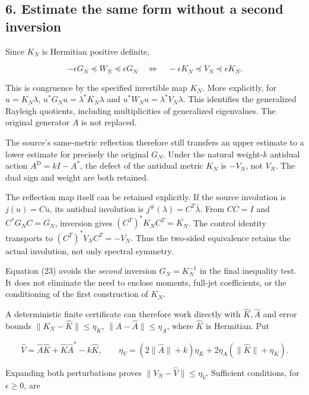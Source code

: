 \documentclass[
]{article}
\begin{document}
\subsection{6. Estimate the same form without a second
inversion}\label{estimate-the-same-form-without-a-second-inversion}

Since \(K_N\) is Hermitian positive definite,

\[
\boxed{-\epsilon G_N\preceq W_N\preceq\epsilon G_N
\quad\Longleftrightarrow\quad
-\epsilon K_N\preceq V_N\preceq\epsilon K_N.}
\tag{23}
\]

This is congruence by the specified invertible map \(K_N\). More
explicitly, for \(u=K_N\lambda\), \(u^*G_Nu=\lambda^*K_N\lambda\) and
\(u^*W_Nu=\lambda^*V_N\lambda\). This identifies the generalized
Rayleigh quotients, including multiplicities of generalized eigenvalues.
The original generator \(A\) is not replaced.

The source's same-metric reflection therefore still transfers an upper
estimate to a lower estimate for precisely the original \(G_N\). Under
the natural weight-\(k\) antidual action \(A^{\mathrm D}=kI-A^*\), the
defect of the antidual metric \(K_N\) is \(-V_N\), not \(V_N\). The dual
sign and weight are both retained.

The reflection map itself can be retained explicitly. If the source
involution is \(j(u)=C\overline u\), its antidual involution is
\(j^\#(\lambda)=C^T\overline\lambda\). From \(C\overline C=I\) and
\(C^*G_NC=\overline{G_N}\), inversion gives
\((C^T)^*K_NC^T=\overline{K_N}\). The control identity transports to
\((C^T)^*V_NC^T=-\overline{V_N}\). Thus the two-sided equivalence
retains the actual involution, not only spectral symmetry.

Equation (23) avoids the \emph{second} inversion \(G_N=K_N^{-1}\) in the
final inequality test. It does not eliminate the need to enclose
moments, full-jet coefficients, or the conditioning of the first
construction of \(K_N\).

A deterministic finite certificate can therefore work directly with
\(\widehat K,\widehat A\) and error bounds
\(\|K_N-\widehat K\|\le\eta_K\), \(\|A-\widehat A\|\le\eta_A\), where
\(\widehat K\) is Hermitian. Put

\[
\widehat V=\widehat A\widehat K+\widehat K\widehat A^*-k\widehat K,
\qquad
\eta_V=(2\|\widehat A\|+k)\eta_K
+2\eta_A(\|\widehat K\|+\eta_K).
\tag{24}
\]

Expanding both perturbations proves \(\|V_N-\widehat V\|\le\eta_V\).
Sufficient conditions, for \(\epsilon\ge0\), are
\end{document}
